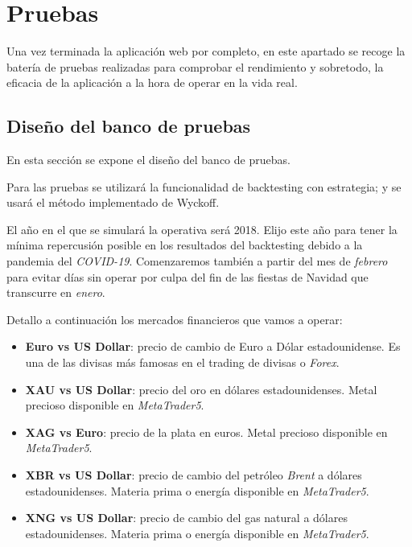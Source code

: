 

\chapter{Pruebas}

Una vez terminada la aplicación web por completo, en este apartado se recoge la batería de pruebas realizadas para comprobar el rendimiento y sobretodo, la eficacia de la aplicación a la hora de operar en la vida real.	\newline

\section{Diseño del banco de pruebas}

En esta sección se expone el diseño del banco de pruebas.\newline

Para las pruebas se utilizará la funcionalidad de backtesting con estrategia; y se usará el método implementado de Wyckoff.\newline

El año en el que se simulará la operativa será 2018. Elijo este año para tener la mínima repercusión posible en los resultados del backtesting debido a la pandemia del \textit{COVID-19}. Comenzaremos también a partir del mes de \textit{febrero} para evitar días sin operar por culpa del fin de las fiestas de Navidad que transcurre en \textit{enero}. \newline

Detallo a continuación los mercados financieros que vamos a operar:\newline

\begin{itemize}
	\item \textbf{Euro vs US Dollar}: precio de cambio de Euro a Dólar estadounidense. Es una de las divisas más famosas en el trading de divisas o \textit{Forex}.
	\item \textbf{XAU vs US Dollar}: precio del oro en dólares estadounidenses. Metal precioso disponible en \textit{MetaTrader5}.
	\item \textbf{XAG vs Euro}: precio de la plata en euros. Metal precioso disponible en \textit{MetaTrader5}.
	\item \textbf{XBR vs US Dollar}: precio de cambio del petróleo \textit{Brent} a dólares estadounidenses. Materia prima o energía disponible en \textit{MetaTrader5}.
	\item \textbf{XNG vs US Dollar}: precio de cambio del gas natural a dólares estadounidenses. Materia prima o energía disponible en \textit{MetaTrader5}.
\end{itemize}

